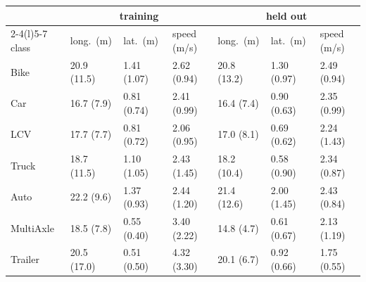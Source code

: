 \begin{tabular}{@{}l lll lll@{}}\toprule
 & \multicolumn{3}{c}{training} & \multicolumn{3}{c}{held out}\\
\cmidrule(lr){2-4}\cmidrule(l){5-7}
class & long.\ (m) & lat.\ (m) & speed (m/s) & long.\ (m) & lat.\ (m) & speed (m/s)\\\midrule
Bike & 20.9 (11.5) & 1.41 (1.07) & 2.62 (0.94) & 20.8 (13.2) & 1.30 (0.97) & 2.49 (0.94)\\
Car & 16.7 (7.9) & 0.81 (0.74) & 2.41 (0.99) & 16.4 (7.4) & 0.90 (0.63) & 2.35 (0.99)\\
LCV & 17.7 (7.7) & 0.81 (0.72) & 2.06 (0.95) & 17.0 (8.1) & 0.69 (0.62) & 2.24 (1.43)\\
Truck & 18.7 (11.5) & 1.10 (1.05) & 2.43 (1.45) & 18.2 (10.4) & 0.58 (0.90) & 2.34 (0.87)\\
Auto & 22.2 (9.6) & 1.37 (0.93) & 2.44 (1.20) & 21.4 (12.6) & 2.00 (1.45) & 2.43 (0.84)\\
MultiAxle & 18.5 (7.8) & 0.55 (0.40) & 3.40 (2.22) & 14.8 (4.7) & 0.61 (0.67) & 2.13 (1.19)\\
Trailer & 20.5 (17.0) & 0.51 (0.50) & 4.32 (3.30) & 20.1 (6.7) & 0.92 (0.66) & 1.75 (0.55)\\
\bottomrule\end{tabular}

